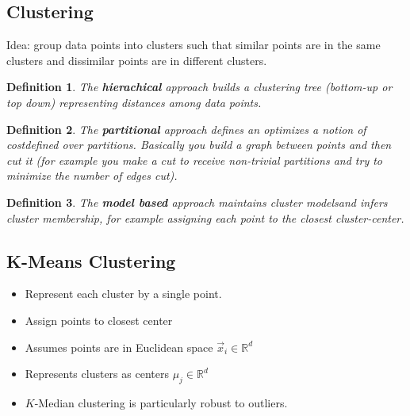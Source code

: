 \documentclass[8pt,a4paper]{scrartcl}
\newtheorem{define}{Definition}
\begin{document}
\begin{multicols*}{3}
\section{Clustering}

Idea: group data points into clusters such that similar points are in the same clusters and dissimilar points are in different clusters.

\begin{define}
The \textbf{hierachical} approach builds a clustering tree (bottom-up or top down) representing distances among data points.
\end{define}

\begin{define}
The \textbf{partitional} approach defines an optimizes a notion of \glqq cost\grqq defined over partitions. Basically you build a graph between points and then cut it (for example you make a cut to receive non-trivial partitions and try to minimize the number of edges cut).
\end{define}

\begin{define}
The \textbf{model based} approach maintains cluster \glqq models\grqq and infers cluster membership, for example assigning each point to the closest cluster-center.
\end{define}

\subsection{K-Means Clustering}

\begin{itemize}
\ncompaq
\item Represent each cluster by a single point.
\item Assign points to closest center
\item Assumes points are in Euclidean space $\vec{x}_i\in\mathbb{R}^d$
\item Represents clusters as centers $\mu_j\in\mathbb{R}^d$
\end{itemize}


\begin{itemize}
\ncompaq
\item $K$-Median clustering is particularly robust to outliers.
\end{itemize}


\end{multicols*}
\end{document}
